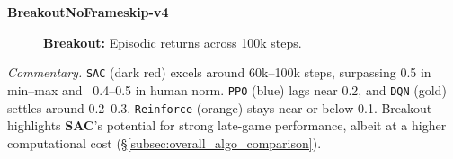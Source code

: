 \noindent
\textbf{BreakoutNoFrameskip-v4}
\begin{figure} 
	\centering
	\quad
	\caption{\textbf{Breakout:} Episodic returns across 100k steps.}
	\label{fig:breakout_comparison_combined}
\end{figure}

\noindent
\emph{Commentary.}
\texttt{SAC} (dark red) excels around 60k--100k steps, surpassing 0.5 in min--max 
and ~0.4--0.5 in human norm. \texttt{PPO} (blue) lags near 0.2, and \texttt{DQN} (gold) 
settles around 0.2--0.3. 
\texttt{Reinforce} (orange) stays near or below 0.1. 
Breakout highlights \textbf{SAC}’s potential for strong late-game performance, 
albeit at a higher computational cost (\S\ref{subsec:overall_algo_comparison}).

\bigskip

